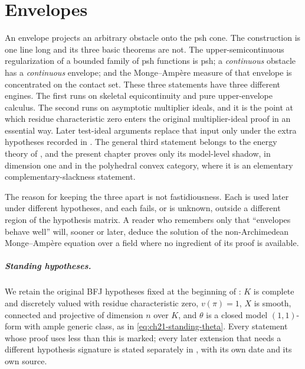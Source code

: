 \chapter{Envelopes}
\label{chap:bfj-envelopes}

An envelope projects an arbitrary obstacle onto the psh cone.  The
construction is one line long and its three basic theorems are not.  The
upper-semicontinuous regularization of a bounded family of psh functions is
psh; a \emph{continuous} obstacle has a \emph{continuous} envelope; and the
Monge--Amp\`ere measure of that envelope is concentrated on the contact set.
These three statements have three different engines.  The first runs on
skeletal equicontinuity and pure upper-envelope calculus.  The second runs on
asymptotic multiplier ideals, and it is the point at which residue
characteristic zero enters the original multiplier-ideal proof in an
essential way.  Later test-ideal arguments replace that input only under the
extra hypotheses recorded in .  The general third
statement belongs
to the energy theory of , and the present
chapter proves only its model-level shadow, in dimension one and in the
polyhedral convex category, where it is an elementary complementary-slackness
statement.

The reason for keeping the three apart is not fastidiousness.  Each is used
later under different hypotheses, and each fails, or is unknown, outside a
different region of the hypothesis matrix.  A reader who remembers only that
``envelopes behave well'' will, sooner or later, deduce the solution of the
non-Archimedean Monge--Amp\`ere equation over a field where no ingredient of
its proof is available.

\paragraph{Standing hypotheses.}
We retain the original BFJ hypotheses fixed at the beginning of
: $K$ is complete and discretely valued with
residue characteristic zero, $v(\pi)=1$, $X$ is smooth, connected and
projective of dimension $n$ over $K$, and $\theta$ is a closed model
$(1,1)$-form with ample generic class, as in
\eqref{eq:ch21-standing-theta}.  Every statement whose proof uses less than
this is marked; every later extension that needs a different hypothesis
signature is stated separately in , with its own date
and its own source.

